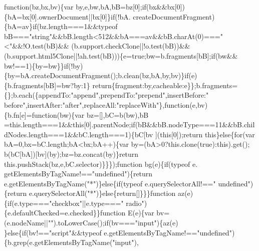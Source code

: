 \begin{DoxyCode}
{      function}(bz,bx,bv)\{var by,e,bw,bA,bB=bz[0];\textcolor{keywordflow}{if}(bx&&bx[0])\{bA=bx[0].ownerDocument||bx[0]\}\textcolor{keywordflow}{if}(!bA.
      createDocumentFragment)\{bA=av\}\textcolor{keywordflow}{if}(bz.length===1&&typeof bB===\textcolor{stringliteral}{"string"}&&bB.length<512&&bA===av&&bB.charAt(0)===\textcolor{stringliteral}{"<"}&&!O.test(bB)&&
      (b.support.checkClone||!o.test(bB))&&(b.support.html5Clone||!ah.test(bB)))\{e=\textcolor{keyword}{true};bw=b.fragments[bB];\textcolor{keywordflow}{if}(bw&&
      bw!==1)\{by=bw\}\}\textcolor{keywordflow}{if}(!by)\{by=bA.createDocumentFragment();b.clean(bz,bA,by,bv)\}\textcolor{keywordflow}{if}(e)\{b.fragments[bB]=bw?by:1\}\textcolor{keywordflow}{
      return}\{fragment:by,cacheable:e\}\};b.fragments=\{\};b.each(\{appendTo:\textcolor{stringliteral}{"append"},prependTo:\textcolor{stringliteral}{"prepend"},insertBefore:\textcolor{stringliteral}{"
      before"},insertAfter:\textcolor{stringliteral}{"after"},replaceAll:\textcolor{stringliteral}{"replaceWith"}\},\textcolor{keyword}{function}(e,bv)\{b.fn[e]=\textcolor{keyword}{function}(bw)\{var bz=[],bC=b(bw),bB
      =this.length===1&&\textcolor{keyword}{this}[0].parentNode;\textcolor{keywordflow}{if}(bB&&bB.nodeType===11&&bB.childNodes.length===1&&bC.length===1)\{bC[bv
      ](\textcolor{keyword}{this}[0]);\textcolor{keywordflow}{return} \textcolor{keyword}{this}\}\textcolor{keywordflow}{else}\{\textcolor{keywordflow}{for}(var bA=0,bx=bC.length;bA<bx;bA++)\{var by=(bA>0?this.clone(\textcolor{keyword}{true}):this).get();
      b(bC[bA])[bv](by);bz=bz.concat(by)\}\textcolor{keywordflow}{return} this.pushStack(bz,e,bC.selector)\}\}\});\textcolor{keyword}{function} bg(e)\{\textcolor{keywordflow}{if}(typeof e.
      getElementsByTagName!==\textcolor{stringliteral}{"undefined"})\{\textcolor{keywordflow}{return} e.getElementsByTagName(\textcolor{stringliteral}{"*"})\}\textcolor{keywordflow}{else}\{\textcolor{keywordflow}{if}(typeof e.querySelectorAll!==\textcolor{stringliteral}{"
      undefined"})\{\textcolor{keywordflow}{return} e.querySelectorAll(\textcolor{stringliteral}{"*"})\}\textcolor{keywordflow}{else}\{\textcolor{keywordflow}{return}[]\}\}\}\textcolor{keyword}{function} az(e)\{\textcolor{keywordflow}{if}(e.type===\textcolor{stringliteral}{"checkbox"}||e.type===\textcolor{stringliteral}{"
      radio"})\{e.defaultChecked=e.checked\}\}\textcolor{keyword}{function} E(e)\{var bv=(e.nodeName||\textcolor{stringliteral}{""}).toLowerCase();\textcolor{keywordflow}{if}(bv===\textcolor{stringliteral}{"input"})\{az(e)
      \}\textcolor{keywordflow}{else}\{\textcolor{keywordflow}{if}(bv!==\textcolor{stringliteral}{"script"}&&typeof e.getElementsByTagName!==\textcolor{stringliteral}{"undefined"})\{b.grep(e.getElementsByTagName(\textcolor{stringliteral}{"input"}),

\end{DoxyCode}

